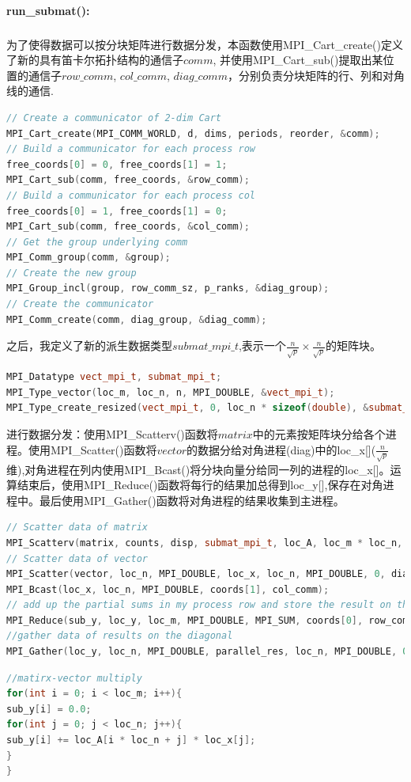 \documentclass[UTF8, onecolumn, a4paper]{article}
\begin{document}
\paragraph*{run\_submat():}
\subparagraph*{}
为了使得数据可以按分块矩阵进行数据分发，本函数使用MPI\_Cart\_create()定义了新的具有笛卡尔拓扑结构的通信子$comm$, 并使用MPI\_Cart\_sub()提取出某位置的通信子$row\_comm$, $col\_comm$, $diag\_comm$，分别负责分块矩阵的行、列和对角线的通信.
\begin{lstlisting}[language={c++}, title={定义新通信子}]
// Create a communicator of 2-dim Cart
MPI_Cart_create(MPI_COMM_WORLD, d, dims, periods, reorder, &comm);
// Build a communicator for each process row
free_coords[0] = 0, free_coords[1] = 1;
MPI_Cart_sub(comm, free_coords, &row_comm);
// Build a communicator for each process col
free_coords[0] = 1, free_coords[1] = 0;
MPI_Cart_sub(comm, free_coords, &col_comm);
// Get the group underlying comm
MPI_Comm_group(comm, &group);
// Create the new group
MPI_Group_incl(group, row_comm_sz, p_ranks, &diag_group);
// Create the communicator
MPI_Comm_create(comm, diag_group, &diag_comm);
\end{lstlisting}
\par 之后，我定义了新的派生数据类型$submat\_mpi\_t$,表示一个$\frac{n}{\sqrt{p}}\times\frac{n}{\sqrt{p}}$的矩阵块。
\begin{lstlisting}[language={c++}, title={定义派生数据类型}]
MPI_Datatype vect_mpi_t, submat_mpi_t;
MPI_Type_vector(loc_m, loc_n, n, MPI_DOUBLE, &vect_mpi_t);
MPI_Type_create_resized(vect_mpi_t, 0, loc_n * sizeof(double), &submat_mpi_t);
\end{lstlisting}
\par 进行数据分发：使用MPI\_Scatterv()函数将$matrix$中的元素按矩阵块分给各个进程。使用MPI\_Scatter()函数将$vector$的数据分给对角进程(diag)中的loc\_x[]($\frac{n}{\sqrt{p}}$维),对角进程在列内使用MPI\_Bcast()将分块向量分给同一列的进程的loc\_x[]。运算结束后，使用MPI\_Reduce()函数将每行的结果加总得到loc\_y[],保存在对角进程中。最后使用MPI\_Gather()函数将对角进程的结果收集到主进程。
\begin{lstlisting}[language={c++}, title={数据分发与收集}]
// Scatter data of matrix
MPI_Scatterv(matrix, counts, disp, submat_mpi_t, loc_A, loc_m * loc_n, MPI_DOUBLE, 0, comm);
// Scatter data of vector
MPI_Scatter(vector, loc_n, MPI_DOUBLE, loc_x, loc_n, MPI_DOUBLE, 0, diag_comm);
MPI_Bcast(loc_x, loc_n, MPI_DOUBLE, coords[1], col_comm);
// add up the partial sums in my process row and store the result on the diagonal
MPI_Reduce(sub_y, loc_y, loc_m, MPI_DOUBLE, MPI_SUM, coords[0], row_comm);
//gather data of results on the diagonal
MPI_Gather(loc_y, loc_n, MPI_DOUBLE, parallel_res, loc_n, MPI_DOUBLE, 0, diag_comm);
\end{lstlisting}
\begin{lstlisting}[language={c++}, title={计算}]
//matirx-vector multiply
for(int i = 0; i < loc_m; i++){
sub_y[i] = 0.0;
for(int j = 0; j < loc_n; j++){
sub_y[i] += loc_A[i * loc_n + j] * loc_x[j];
}
}
\end{lstlisting}
\end{document}
